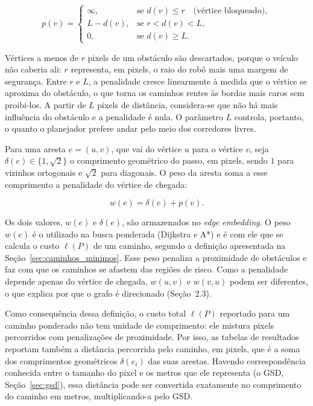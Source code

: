 \documentclass[
    12pt,
    openright,
    oneside,
    a4paper,
    english,
    brazil
]{abntex2}
\begin{document}
\[
p(v) =
\begin{cases}
\infty, & \text{se } d(v) \leq r \quad \text{(vértice bloqueado)},\\[0.3em]
L - d(v), & \text{se } r < d(v) < L,\\[0.3em]
0, & \text{se } d(v) \geq L.
\end{cases}
\]

Vértices a menos de $r$ pixels de um obstáculo são descartados, porque o veículo não caberia ali: $r$ representa, em pixels, o raio do robô mais uma margem de segurança. Entre $r$ e $L$, a penalidade cresce linearmente à medida que o vértice se aproxima do obstáculo, o que torna os caminhos rentes às bordas mais caros sem proibi-los. A partir de $L$ pixels de distância, considera-se que não há mais influência do obstáculo e a penalidade é nula. O parâmetro $L$ controla, portanto, o quanto o planejador prefere andar pelo meio dos corredores livres.

Para uma aresta $e = (u, v)$, que vai do vértice $u$ para o vértice $v$, seja $\delta(e) \in \{1, \sqrt{2}\}$ o comprimento geométrico do passo, em pixels, sendo $1$ para vizinhos ortogonais e $\sqrt{2}$ para diagonais. O peso da aresta soma a esse comprimento a penalidade do vértice de chegada:

\[
w(e) = \delta(e) + p(v).
\]

Os dois valores, $w(e)$ e $\delta(e)$, são armazenados no \textit{edge embedding}. O peso $w(e)$ é o utilizado na busca ponderada (Dijkstra e A*) e é com ele que se calcula o custo $\ell(P)$ de um caminho, segundo a definição apresentada na Seção~\ref{sec:caminhos_minimos}. Esse peso penaliza a proximidade de obstáculos e faz com que os caminhos se afastem das regiões de risco. Como a penalidade depende apenas do vértice de chegada, $w(u, v)$ e $w(v, u)$ podem ser diferentes, o que explica por que o grafo é direcionado (Seção~2.3).

Como consequência dessa definição, o custo total $\ell(P)$ reportado para um caminho ponderado não tem unidade de comprimento: ele mistura pixels percorridos com penalizações de proximidade. Por isso, as tabelas de resultados reportam também a distância percorrida pelo caminho, em pixels, que é a soma dos comprimentos geométricos $\delta(e_i)$ das suas arestas. Havendo correspondência conhecida entre o tamanho do pixel e os metros que ele representa (o GSD, Seção~\ref{sec:gsd}), essa distância pode ser convertida exatamente no comprimento do caminho em metros, multiplicando-a pelo GSD.
\end{document}
